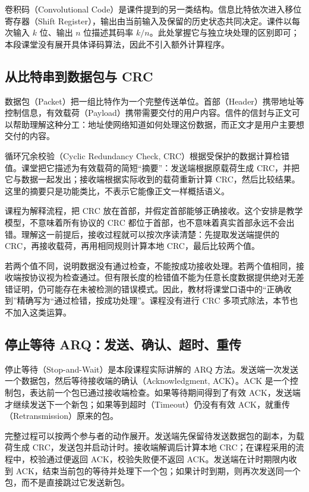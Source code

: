 卷积码（Convolutional Code）是课件提到的另一类结构。信息比特依次进入移位寄存器（Shift Register），输出由当前输入及保留的历史状态共同决定。课件以每次输入 $k$ 位、输出 $n$ 位描述其码率 $k/n$。此处掌握它与独立块处理的区别即可；本段课堂没有展开具体译码算法，因此不引入额外计算程序。

\subsection{从比特串到数据包与 CRC}
数据包（Packet）把一组比特作为一个完整传送单位。首部（Header）携带地址等控制信息，有效载荷（Payload）携带需要交付的用户内容。信件的信封与正文可以帮助理解这种分工：地址使网络知道如何处理这份数据，而正文才是用户主要想交付的内容。

循环冗余校验（Cyclic Redundancy Check, CRC）根据受保护的数据计算检错值。课堂把它描述为有效载荷的简短“摘要”：发送端根据原载荷生成 CRC，并把它与数据一起发出；接收端根据实际收到的载荷重新计算 CRC，然后比较结果。这里的摘要只是功能类比，不表示它能像正文一样概括语义。

课程为解释流程，把 CRC 放在首部，并假定首部能够正确接收。这个安排是教学模型，不意味着所有协议的 CRC 都位于首部，也不意味着真实首部永远不会出错。理解这一前提后，接收过程就可以按次序读清楚：先提取发送端提供的 CRC，再接收载荷，再用相同规则计算本地 CRC，最后比较两个值。

若两个值不同，说明数据没有通过检查，不能按成功接收处理。若两个值相同，接收端按协议视为检查通过。但有限长度的检错值不能为任意长度数据提供绝对无差错证明，仍可能存在未被检测的错误模式。因此，教材将课堂口语中的“正确收到”精确写为“通过检错，按成功处理”。课程没有进行 CRC 多项式除法，本节也不加入这类运算。

\subsection{停止等待 ARQ：发送、确认、超时、重传}
停止等待（Stop-and-Wait）是本段课程实际讲解的 ARQ 方法。发送端一次发送一个数据包，然后等待接收端的确认（Acknowledgment, ACK）。ACK 是一个控制包，表达前一个包已通过接收端检查。如果等待期间得到了有效 ACK，发送端才继续发送下一个新包；如果等到超时（Timeout）仍没有有效 ACK，就重传（Retransmission）原来的包。

完整过程可以按两个参与者的动作展开。发送端先保留待发送数据包的副本，为载荷生成 CRC，发送包并启动计时。接收端解调后计算本地 CRC；在课程采用的流程中，校验通过便返回 ACK，校验失败便不返回 ACK。发送端在计时期限内收到 ACK，结束当前包的等待并处理下一个包；如果计时到期，则再次发送同一个包，而不是直接跳过它发送新包。

